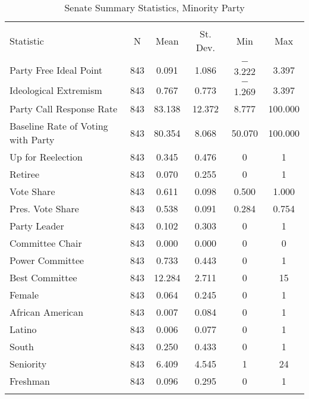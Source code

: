 \documentclass[12pt]{article}
\begin{document}
\begin{table}[H] 
	\centering 
	\singlespacing
	\caption{Senate Summary Statistics, Minority Party } 
	\label{} 
	\begin{tabular}{@{\extracolsep{5pt}}lccccc} 
		\\[-1.8ex]\hline 
		\hline \\[-1.8ex] 
		Statistic & \multicolumn{1}{c}{N} & \multicolumn{1}{c}{Mean} & \multicolumn{1}{c}{St. Dev.} & \multicolumn{1}{c}{Min} & \multicolumn{1}{c}{Max} \\ 
		\hline \\[-1.8ex] 
		
		Party Free Ideal Point & 843 & 0.091 & 1.086 & $-$3.222 & 3.397 \\ 
		Ideological Extremism & 843 & 0.767 & 0.773 & $-$1.269 & 3.397 \\ 		
		Party Call Response Rate & 843 & 83.138 & 12.372 & 8.777 & 100.000 \\ 
		Baseline Rate of Voting with Party & 843 & 80.354 & 8.068 & 50.070 & 100.000 \\ 
		
		Up for Reelection & 843 & 0.345 & 0.476 & 0 & 1 \\ 
		Retiree & 843 & 0.070 & 0.255 & 0 & 1 \\ 
		Vote Share & 843 & 0.611 & 0.098 & 0.500 & 1.000 \\ 
		Pres. Vote Share & 843 & 0.538 & 0.091 & 0.284 & 0.754 \\ 
		Party Leader & 843 & 0.102 & 0.303 & 0 & 1 \\ 
		Committee Chair & 843 & 0.000 & 0.000 & 0 & 0 \\ 
		Power Committee & 843 & 0.733 & 0.443 & 0 & 1 \\ 
		Best Committee & 843 & 12.284 & 2.711 & 0 & 15 \\ 
		Female & 843 & 0.064 & 0.245 & 0 & 1 \\ 
		African American & 843 & 0.007 & 0.084 & 0 & 1 \\ 
		Latino & 843 & 0.006 & 0.077 & 0 & 1 \\ 
		South & 843 & 0.250 & 0.433 & 0 & 1 \\ 
		Seniority & 843 & 6.409 & 4.545 & 1 & 24 \\ 
		Freshman & 843 & 0.096 & 0.295 & 0 & 1 \\ 
		\hline \\[-1.8ex] 
	\end{tabular} 
\end{table} 
\end{document}
